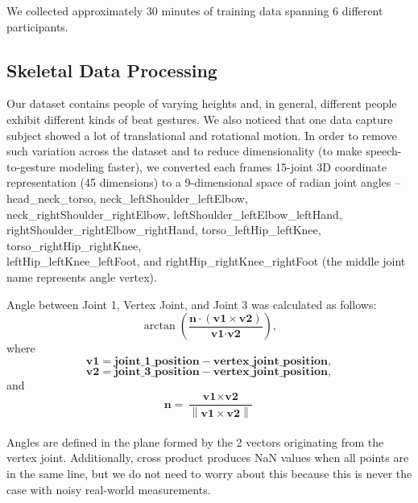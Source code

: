 We collected approximately 30 minutes of training data spanning 6 different participants.

\subsection{Skeletal Data Processing}
Our dataset contains people of varying heights and, in general, different people exhibit different kinds of beat gestures. We also noticed that one data capture subject showed a lot of translational and rotational motion. In order to remove such variation across the dataset and to reduce dimensionality (to make speech-to-gesture modeling faster), we converted each frame\textquotesingle s 15-joint 3D coordinate representation (45 dimensions) to a 9-dimensional space of radian joint angles -- head\_neck\_torso, neck\_leftShoulder\_leftElbow, neck\_rightShoulder\_rightElbow, leftShoulder\_leftElbow\_leftHand, rightShoulder\_rightElbow\_rightHand, torso\_leftHip\_leftKnee, \\torso\_rightHip\_rightKnee, \\leftHip\_leftKnee\_leftFoot, and rightHip\_rightKnee\_rightFoot (the middle joint name represents angle vertex).

Angle between Joint 1, Vertex Joint, and Joint 3 was calculated as follows:\\
\begin{displaymath}
\arctan\left (\frac{\textbf{n} \cdot \left( \textbf{v1} \times \textbf{v2}\right )}{\textbf{v1} \cdot \textbf{v2}} \right ),
\end{displaymath}
where
\begin{displaymath}
\textbf{v1} = \textbf{joint\_1\_position} -  \textbf{vertex\_joint\_position},
\end{displaymath}
\begin{displaymath}
\textbf{v2} = \textbf{joint\_3\_position} -  \textbf{vertex\_joint\_position},
\end{displaymath}
and
\begin{displaymath}
\textbf{n} = \frac{\textbf{v1} \times \textbf{v2}}{\left \| \textbf{v1} \times \textbf{v2} \right \|}
\end{displaymath}\\
Angles are defined in the plane formed by the 2 vectors originating from the vertex joint. Additionally, cross product produces NaN values when all points are in the same line, but we do not need to worry about this because this is never the case with noisy real-world measurements.

